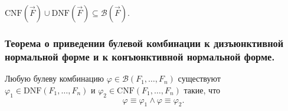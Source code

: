 \documentclass[a4paper, fleqn]{article}
\begin{document}
    \begin{corollary}
        $\text{CNF}\left(\vec{F}\right) \cup \text{DNF}\left(\vec{F}\right) 
        \subseteq \mathcal{B}\left(\vec{F}\right)$.
    \end{corollary}

    \subsubsection{Теорема о приведении булевой комбинации к дизъюнктивной нормальной форме и к конъюнктивной нормальной форме.}

    \begin{theorem}
        Любую булеву комбинацию $\varphi \in \mathcal{B}(F_{1}, \ldots, F_{n})$ существуют 
        $\varphi_{1} \in \text{DNF}(F_{1}, \ldots, F_{n})$ и $\varphi_{2} \in 
        \text{CNF}(F_{1}, \ldots, F_{n})$ такие, что
        \[
            \varphi \equiv \varphi_{1} \land \varphi \equiv \varphi_{2}.
        \]
    \end{theorem}
  
\end{document}
